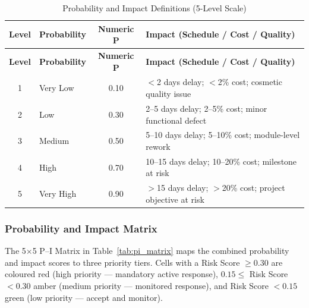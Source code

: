 \documentclass[12pt,a4paper]{article}
\begin{document}
{\footnotesize
\begin{longtable}{@{}c l c l@{}}
\caption{Probability and Impact Definitions (5-Level Scale)}\label{tab:pi_definitions}\\
\toprule
\textbf{Level} & \textbf{Probability} & \textbf{Numeric P} & \textbf{Impact (Schedule / Cost / Quality)} \\
\midrule
\endfirsthead
\toprule
\textbf{Level} & \textbf{Probability} & \textbf{Numeric P} & \textbf{Impact (Schedule / Cost / Quality)} \\
\midrule
\endhead
1 & Very Low  & 0.10 & $<$2 days delay; $<$2\% cost; cosmetic quality issue \\
2 & Low       & 0.30 & 2--5 days delay; 2--5\% cost; minor functional defect \\
3 & Medium    & 0.50 & 5--10 days delay; 5--10\% cost; module-level rework \\
4 & High      & 0.70 & 10--15 days delay; 10--20\% cost; milestone at risk \\
5 & Very High & 0.90 & $>$15 days delay; $>$20\% cost; project objective at risk \\
\bottomrule
\end{longtable}
}

\subsubsection{Probability and Impact Matrix}

The 5$\times$5 P--I Matrix in Table~\ref{tab:pi_matrix} maps the combined probability and impact scores to three priority tiers. Cells with a Risk Score $\geq 0.30$ are coloured red (high priority --- mandatory active response), $0.15 \leq$ Risk Score $< 0.30$ amber (medium priority --- monitored response), and Risk Score $< 0.15$ green (low priority --- accept and monitor).
\end{document}

